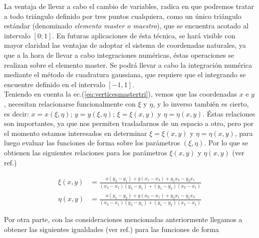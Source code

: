 La ventaja de llevar a cabo el cambio de variables, radica en que podremos tratar a todo triángulo definido por tres puntos cualquiera, como un único triángulo estándar (denominado \emph{elemento master o maestro}), que se encuentra acotado al intervalo $ [0; 1] $. En futuras aplicaciones de ésta técnica, se hará visible con mayor claridad las ventajas de adoptar el sistema de coordenadas naturales, ya que a la hora de llevar a cabo integraciones numéricas, éstas operaciones se realizan sobre el elemento master. Se podrá llevar a cabo la integración numérica mediante el método de cuadratura gaussiana, que requiere que el integrando se encuentre definido en el intervalo $[-1,1]$.
\\
Teniendo en cuenta la ec.(\ref{eq:verticesmastertri}), vemos que las coordenadas $x$ e $y$, necesitan relacionarse funcionalmente con  $\xi$ y $\eta$, y lo inverso también es cierto, es decir: $x=x( \xi, \eta)$; $y=y( \xi, \eta)$; $\xi= \xi(x,y)$ y $\eta= \eta(x,y)$. Éstas relaciones son importantes, ya que nos permiten trasladarnos de un espacio a otro, pero por el momento estamos interesados en determinar $\xi= \xi(x,y)$ y $\eta= \eta(x,y)$, para luego evaluar las funciones de forma sobre los parámetros $(\xi, \eta)$. Por lo que se obtienen las siguientes relaciones para los parámetros $\xi(x,y)$ y $\eta(x,y)$ (ver ref.\cite{Hal})
 
\begin{equation}
  \label{eq:chietadexy}
  \begin{split}
    \xi(x,y) & =
    \frac{x(y_3-y_1)+y(x_1-x_3)+y_1x_3-y_3x_1}{(x_2-x_1)(y_3-y_1)+(y_1-y_2)(x_3-x_1)} \\
    \eta(x,y) & =
    \frac{x(y_1-y_2)+y(x_2-x_1)+y_2x_1-y_1x_2}{(x_2-x_1)(y_3-y_1)+(y_1-y_2)(x_3-x_1)}
  \end{split}
\end{equation}

Por otra parte, con las consideraciones mencionadas anteriormente llegamos a obtener las siguientes igualdades (ver ref.\cite{Hirsch}) para las funciones de forma

